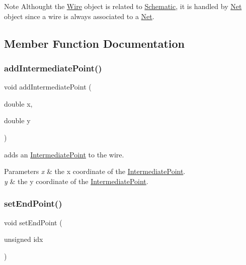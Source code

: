 \begin{DoxyNote}{Note}
Althought the \hyperlink{class_open_chams_1_1_wire}{Wire} object is related to \hyperlink{class_open_chams_1_1_schematic}{Schematic}, it is handled by \hyperlink{class_open_chams_1_1_net}{Net} object since a wire is always associated to a \hyperlink{class_open_chams_1_1_net}{Net}. 
\end{DoxyNote}


\subsection{Member Function Documentation}
\mbox{\label{class_open_chams_1_1_wire_aab66049b1f5ccf8de85249720152833a}} 
\subsubsection{\texorpdfstring{add\+Intermediate\+Point()}{addIntermediatePoint()}}
{\footnotesize\ttfamily void add\+Intermediate\+Point (\begin{DoxyParamCaption}\item[{double}]{x,  }\item[{double}]{y }\end{DoxyParamCaption})}



adds an \hyperlink{class_open_chams_1_1_intermediate_point}{Intermediate\+Point} to the wire. 


\begin{DoxyParams}{Parameters}
{\em x} & the x coordinate of the \hyperlink{class_open_chams_1_1_intermediate_point}{Intermediate\+Point}. \\
\hline
{\em y} & the y coordinate of the \hyperlink{class_open_chams_1_1_intermediate_point}{Intermediate\+Point}. \\
\hline
\end{DoxyParams}
\mbox{\label{class_open_chams_1_1_wire_a25430c9acf02567164074625ba56e5ef}} 
\subsubsection{\texorpdfstring{set\+End\+Point()}{setEndPoint()}}
{\footnotesize\ttfamily void set\+End\+Point (\begin{DoxyParamCaption}\item[{unsigned}]{idx }\end{DoxyParamCaption})}




